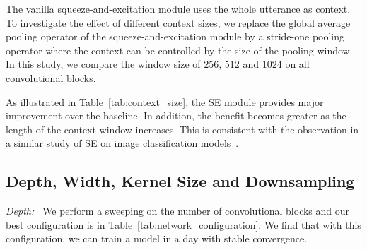 \documentclass[a4paper]{article}
\begin{document}
The vanilla squeeze-and-excitation module uses the whole utterance as context. To investigate the effect of different context sizes, we replace the global average pooling operator of the squeeze-and-excitation module by a stride-one pooling operator where the context can be controlled by the size of the pooling window. In this study, we compare the window size of $256$, $512$ and $1024$ on all convolutional blocks.

As illustrated in Table~\ref{tab:context_size}, the SE module provides major improvement over the baseline. In addition, the benefit becomes greater as the length of the context window increases. This is consistent with the observation in a similar study of SE on image classification models~\cite{hu2018gather}.


\begin{table}[h!]
\centering
\caption{Effect of the context window size on WER. All models have $\alpha=1.25$.}

\label{tab:context_size}
\end{table}

\vspace{-0.1in}
\subsection{Depth, Width, Kernel Size and Downsampling}
\vspace{-0.02in}
\label{sec:exp:filter_size}
\textit{Depth:\ } We perform a sweeping on the number of convolutional blocks and our best configuration is in Table~\ref{tab:network_configuration}. We find that with this configuration, we can train a model in a day with stable convergence.
\end{document}
